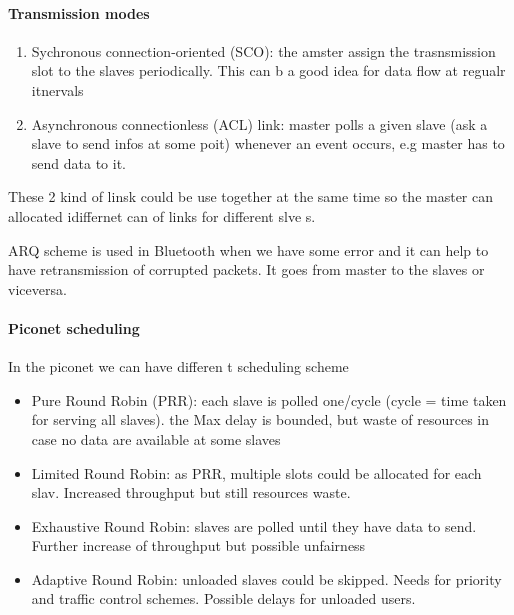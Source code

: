 \paragraph{Transmission modes}
\begin{enumerate}
\item Sychronous connection-oriented (SCO): the amster assign the trasnsmission slot to the slaves periodically. This can b a good idea for data flow at regualr itnervals
\item Asynchronous connectionless (ACL) link: master polls a given slave (ask a slave to send infos at some poit) whenever an event occurs, e.g master has to send data to it.
\end{enumerate}
These 2 kind of linsk could be use together at the same time so the master can allocated idiffernet can of links for different slve s. 

ARQ scheme is used in Bluetooth when we have some error and it can help to have retransmission of corrupted packets. It goes from master to the slaves or viceversa. 

\paragraph{Piconet scheduling}
In the piconet we can have differen t scheduling scheme 
\begin{itemize}
\item Pure Round Robin (PRR): each slave is polled one/cycle (cycle = time taken for serving all slaves). the Max delay is bounded, but waste of resources in case no data are available at some slaves
\item Limited Round Robin: as PRR, multiple slots could be allocated for each slav. Increased throughput but still resources waste. 
\item Exhaustive Round Robin: slaves are polled until they have data to send. Further increase of throughput but possible unfairness
\item Adaptive Round Robin: unloaded slaves could be skipped. Needs for priority and traffic control schemes. Possible delays for unloaded users. 
\end{itemize}


